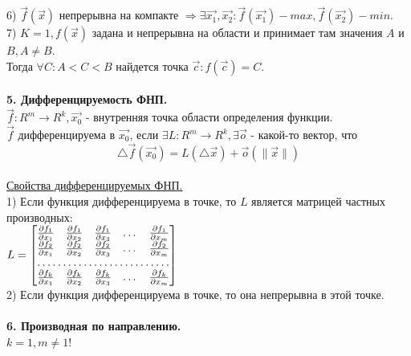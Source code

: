 \documentclass[12pt]{article}
\begin{document}
6) $\overrightarrow{f}(\overrightarrow{x})$ непрерывна на компакте $\Rightarrow \exists \overrightarrow{x_1},\overrightarrow{x_2} : \overrightarrow{f}(\overrightarrow{x_1}) - max, \overrightarrow{f}(\overrightarrow{x_2}) - min$.\\
7) $K = 1, f(\overrightarrow{x})$ задана и непрерывна на области и принимает там значения $A$ и $B, A \neq B$.\\
Тогда $\forall C : A<C<B$ найдется точка $\overrightarrow{c} : f(\overrightarrow{c}) = C$.\\
\\
\label{question5_1}\textbf{5. Дифференцируемость ФНП.}\\
$\overrightarrow{f} : R^m \to R^k, \overrightarrow{x_0}$ - внутренняя точка области определения функции.\\
$\overrightarrow{f}$ дифференцируема в $\overrightarrow{x_0}$, если $\exists L : R^m \to R^k, \exists \overrightarrow{o}$ - какой-то вектор, что\\
$$\bigtriangleup \overrightarrow{f} (\overrightarrow{x_0}) = L(\bigtriangleup \overrightarrow{x}) + \overrightarrow{o} (\|\overrightarrow{x}\|)$$
\\
\label{question5_2}\underline{Свойства дифференцируемых ФНП.}\\
1) Если функция дифференцируема в точке, то $L$ является матрицей частных производных:\\
$L = \begin{bmatrix}
   \frac{\partial f_1}{\partial x_1} & \frac{\partial f_1}{\partial x_2} & \frac{\partial f_1}{\partial x_3} & \dots & \frac{\partial f_1}{\partial x_m} \\
   \frac{\partial f_2}{\partial x_1} & \frac{\partial f_2}{\partial x_2} & \frac{\partial f_2}{\partial x_3} & \dots & \frac{\partial f_2}{\partial x_m} \\
    \hdotsfor{5} \\
    \frac{\partial f_k}{\partial x_1} & \frac{\partial f_k}{\partial x_2} & \frac{\partial f_k}{\partial x_3} & \dots & \frac{\partial f_k}{\partial x_m} \\
\end{bmatrix}
$\\
2) Если функция дифференцируема в точке, то она непрерывна в этой точке.\\
\\
\label{question6}\textbf{6. Производная по направлению.}\\
$k = 1, m \neq 1$!\\
\end{document}
